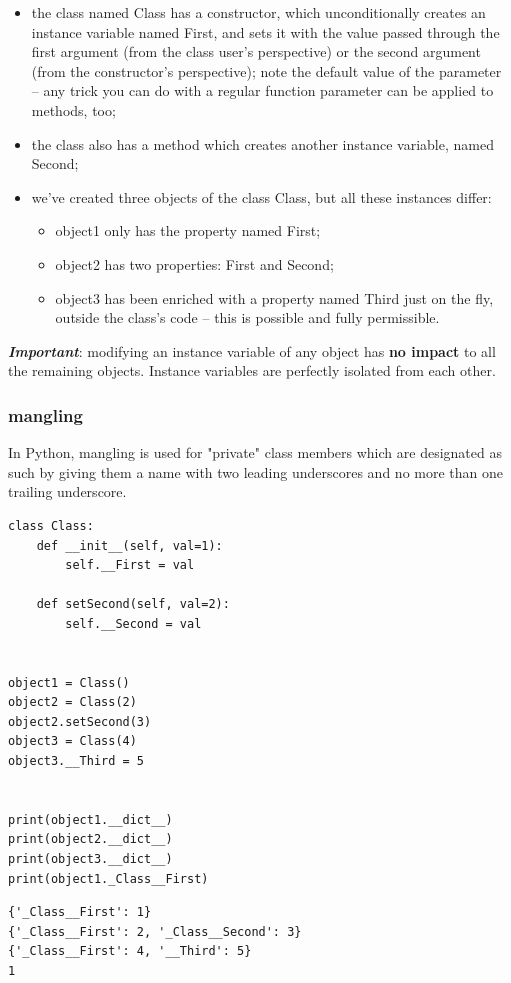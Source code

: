 \documentclass[11pt]{article}
\begin{document}
\begin{itemize}
\item the class named Class has a constructor, which unconditionally
creates an instance variable named First, and sets it with the value
passed through the first argument (from the class user’s
perspective) or the second argument (from the constructor’s
perspective); note the default value of the parameter – any trick
you can do with a regular function parameter can be applied to
methods, too;
\item the class also has a method which creates another instance variable,
named Second;
\item we’ve created three objects of the class Class, but all these
instances differ:
\begin{itemize}
\item object1 only has the property named First;
\item object2 has two properties: First and Second;
\item object3 has been enriched with a property named Third just on the
fly, outside the class’s code – this is possible and fully
permissible.
\end{itemize}
\end{itemize}

\emph{\textbf{Important}}: modifying an instance variable of any object has \textbf{no
impact} to all the remaining objects. Instance variables are perfectly
isolated from each other.

\subsubsection{mangling}
\label{sec:orgcf475a8}
In Python, mangling is used for "private" class members which are
designated as such by giving them a name with two leading underscores
and no more than one trailing underscore.

\begin{verbatim}
class Class:
	def __init__(self, val=1):
		self.__First = val

	def setSecond(self, val=2):
		self.__Second = val


object1 = Class()
object2 = Class(2)
object2.setSecond(3)
object3 = Class(4)
object3.__Third = 5


print(object1.__dict__)
print(object2.__dict__)
print(object3.__dict__)
print(object1._Class__First)
\end{verbatim}

\begin{verbatim}
{'_Class__First': 1}
{'_Class__First': 2, '_Class__Second': 3}
{'_Class__First': 4, '__Third': 5}
1
\end{verbatim}
\end{document}

